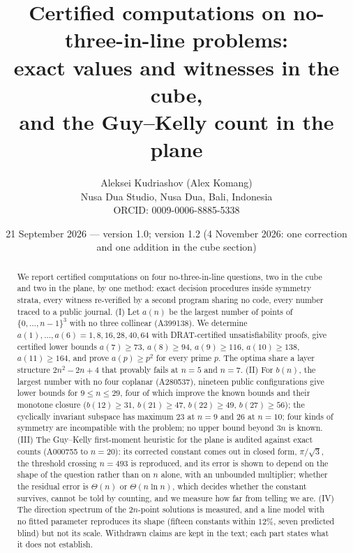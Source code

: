 \documentclass[11pt,a4paper]{article}
\title{Certified computations on no-three-in-line problems:\\ exact values and witnesses in the cube,\\ and the Guy--Kelly count in the plane}
\author{Aleksei Kudriashov (Alex Komang)\\ \small Nusa Dua Studio, Nusa Dua, Bali, Indonesia\\ \small ORCID: 0009-0006-8885-5338}
\date{21 September 2026 --- version 1.0; version 1.2 (4 November 2026: one correction and one addition in the cube section)}
\begin{document}
\maketitle
\begin{abstract}
We report certified computations on four no-three-in-line questions, two in the cube and two in the plane, by one method:
exact decision procedures inside symmetry strata, every witness re-verified by a second program sharing no code, every number
traced to a public journal.
(I) Let $a(n)$ be the largest number of points of $\{0,\dots,n-1\}^3$ with no three collinear (A399138). We determine
$a(1),\dots,a(6)=1,8,16,28,40,64$ with DRAT-certified unsatisfiability proofs, give certified lower bounds
$a(7)\ge73$, $a(8)\ge94$, $a(9)\ge116$, $a(10)\ge138$, $a(11)\ge164$, and prove $a(p)\ge p^2$ for every prime $p$. The optima
share a layer structure $2n^2-2n+4$ that provably fails at $n=5$ and $n=7$.
(II) For $b(n)$, the largest number with no four coplanar (A280537), nineteen public configurations give lower bounds for
$9\le n\le29$, four of which improve the known bounds and their monotone closure ($b(12)\ge31$, $b(21)\ge47$, $b(22)\ge49$,
$b(27)\ge56$); the cyclically invariant subspace has maximum $23$ at $n=9$ and $26$ at $n=10$; four kinds of symmetry are
incompatible with the problem; no upper bound beyond $3n$ is known.
(III) The Guy--Kelly first-moment heuristic for the plane is audited against exact counts (A000755 to $n=20$): its corrected
constant comes out in closed form, $\pi/\sqrt3$, the threshold crossing $n=493$ is reproduced, and its error is shown to depend
on the shape of the question rather than on $n$ alone, with an unbounded multiplier; whether the residual error is
$\Theta(n)$ or $\Theta(n\ln n)$, which decides whether the constant survives, cannot be told by counting, and we measure how far
from telling we are.
(IV) The direction spectrum of the $2n$-point solutions is measured, and a line model with no fitted
parameter reproduces its shape (fifteen constants within $12\%$, seven predicted blind) but not its scale.
Withdrawn claims are kept in the text; each part states what it does not establish.
\end{abstract}
\end{document}
